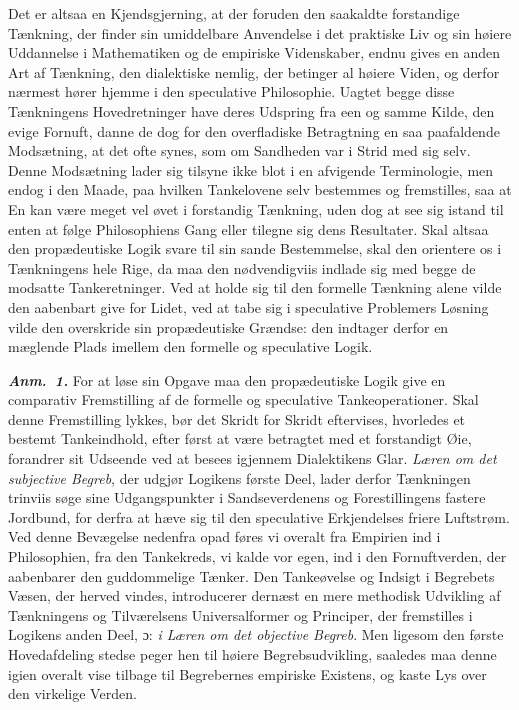 \documentclass[12pt]{book}
\newcommand{\anm}[1]{\emph{\textbf{Anm.~#1.}}}
\newcommand{\dsi}{\textup{ɔ:}}
\newcommand{\opage}[1]{\marginnote{\footnotesize\textit{[#1]}}}
\begin{document}
Det er altsaa en Kjendsgjerning, at der foruden den saakaldte forstandige
Tænkning, der finder sin umiddelbare Anvendelse i det praktiske Liv og sin
høiere Uddannelse i Mathematiken og de empiriske Videnskaber, endnu gives en
anden Art af Tænkning, den dialektiske nemlig, der betinger al høiere Viden,
og derfor nærmest hører hjemme i den speculative Philosophie. Uagtet begge
disse Tænkningens Hovedretninger have deres Udspring fra een og samme Kilde,
den evige Fornuft, danne de dog for den overfladiske Betragtning en saa
paafaldende Modsætning, at det ofte synes, som om Sandheden var i Strid med
sig selv. Denne Modsætning lader sig tilsyne ikke blot i en afvigende
Terminologie, men endog i den Maade, paa hvilken Tankelovene selv bestemmes og
fremstilles, saa at En kan være meget vel øvet i forstandig Tænkning, uden dog
at see sig istand til enten at følge Philosophiens Gang eller tilegne sig dens
Resultater. Skal altsaa den propædeutiske Logik
\opage{5} svare til sin sande Bestemmelse, skal den orientere os i Tænkningens hele
Rige, da maa den nødvendigviis indlade sig med begge de modsatte
Tankeretninger. Ved at holde sig til den formelle Tænkning alene vilde den
aabenbart give for Lidet, ved at tabe sig i speculative Problemers Løsning
vilde den overskride sin propædeutiske Grændse: den indtager derfor en
mæglende Plads imellem den formelle og speculative Logik.

\anm{1} For at løse sin Opgave maa den propædeutiske Logik give en comparativ
Fremstilling af de formelle og speculative Tankeoperationer. Skal denne
Fremstilling lykkes, bør det Skridt for Skridt eftervises, hvorledes et
bestemt Tankeindhold, efter først at være betragtet med et forstandigt Øie,
forandrer sit Udseende ved at besees igjennem Dialektikens Glar. \emph{Læren
om det subjective Begreb}, der udgjør Logikens første Deel, lader derfor
Tænkningen trinviis søge sine Udgangspunkter i Sandseverdenens og
Forestillingens fastere Jordbund, for derfra at hæve sig til den speculative
Erkjendelses friere Luftstrøm. Ved denne Bevægelse nedenfra opad føres vi
overalt fra Empirien ind i Philosophien, fra den Tankekreds, vi kalde vor
egen, ind i den Fornuftverden, der aabenbarer den guddommelige Tænker. Den
Tankeøvelse og Indsigt i Begrebets Væsen, der herved vindes, introducerer
dernæst en mere methodisk Udvikling af Tænkningens og Tilværelsens
Universalformer og Principer, der fremstilles i Logikens anden Deel, \dsi{}
\emph{i Læren om det objective Begreb}. Men ligesom den første Hovedafdeling
stedse peger hen til høiere Begrebsudvikling, saaledes maa denne igien overalt
vise tilbage til Begrebernes empiriske Existens, og kaste Lys over den
virkelige Verden.
\end{document}
